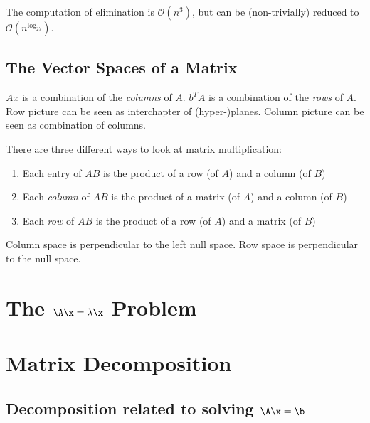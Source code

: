 
\begin{rmk}
	The computation of elimination is $\mathcal{O}(n^3)$, but can be (non-trivially) reduced to $\mathcal{O}(n^{\log_27})$.
\end{rmk}

\section{The Vector Spaces of a Matrix}
\begin{rmk}
	$Ax$ is a combination of the {\em{columns}} of $A$. $b^TA$ is a combination of the {\em{rows}} of $A$. Row picture can be seen as interchapter of (hyper-)planes. Column picture can be seen as combination of columns.
\end{rmk}

\begin{rmk}
	There are three different ways to look at matrix multiplication:
	\begin{enumerate}
		\item Each entry of $AB$ is the product of a row (of $A$) and a column (of $B$)
		\item Each {\em{column}} of $AB$ is the product of a matrix (of $A$) and a column (of $B$)
		\item Each {\em{row}} of $AB$ is the product of a row (of $A$) and a matrix (of $B$)
	\end{enumerate}
\end{rmk}

\begin{rmk}
	Column space is perpendicular to the left null space. Row space is perpendicular to the null space.
\end{rmk}




\chapter{The $\A\x=\lambda \x$ Problem}

\chapter{Matrix Decomposition}
\section{Decomposition related to solving $\A\x = \b$}
